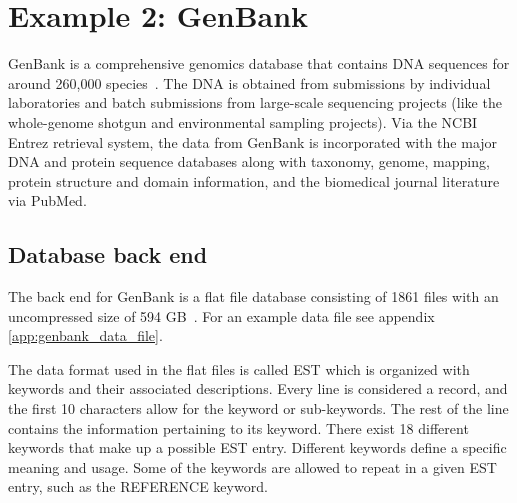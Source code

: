 \documentclass[12pt]{ucthesis}
\begin{document}
\section{Example 2: GenBank}
GenBank is a comprehensive genomics database that contains DNA sequences for around 260,000 species~\cite{genbank}. The DNA is obtained from submissions by individual laboratories and batch submissions from large-scale sequencing projects (like the whole-genome shotgun and environmental sampling projects). Via the NCBI Entrez retrieval system, the data from GenBank is incorporated with the major DNA and protein sequence databases along with taxonomy, genome, mapping, protein structure and domain information, and the biomedical journal literature via PubMed.

\subsection{Database back end}
The back end for GenBank is a flat file database consisting of 1861 files with an uncompressed size of 594 GB~\cite{genbank_195}. For an example data file see appendix \ref{app:genbank_data_file}.

The data format used in the flat files is called EST which is organized with keywords and their associated descriptions. Every line is considered a record, and the first 10 characters allow for the keyword or sub-keywords. The rest of the line contains the information pertaining to its keyword.
There exist 18 different keywords that make up a possible EST entry. Different keywords define a specific meaning and usage. Some of the keywords are allowed to repeat in a given EST entry, such as the REFERENCE
keyword.
\end{document}
